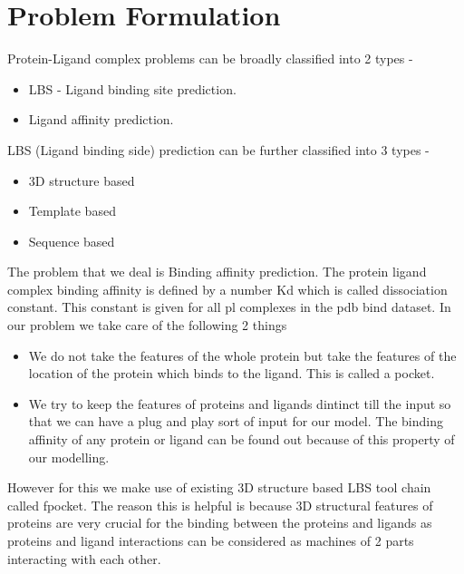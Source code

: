 \documentclass[11pt]{article}
\begin{document}
\section{Problem Formulation}
Protein-Ligand complex problems can be broadly classified into 2 types -
\begin{itemize}
\item LBS - Ligand binding site prediction.
\item Ligand affinity prediction.
\end{itemize} 

LBS (Ligand binding side) prediction can be further classified into 3 types -
\begin{itemize}
\item 3D structure based
\item Template based
\item Sequence based
\end{itemize}

The problem that we deal is Binding affinity prediction. 
The protein ligand complex binding affinity is defined by a number Kd which is called dissociation constant.
This constant is given for all pl complexes in the pdb bind dataset.
In our problem we take care of the following 2 things
\begin{itemize}
\item We do not take the features of the whole protein
but take the features of the location of the protein which binds to the ligand.
This is called a pocket.
\item We try to keep the features of proteins and ligands dintinct till the input so that we can have a plug and play sort of input for our model.
The binding affinity of any protein or ligand can be found out because of this property of our modelling.
\end{itemize}

However for this we make use of existing 3D structure based LBS tool chain called fpocket.
The reason this is helpful is because 3D structural features of proteins are very crucial for the binding between 
the proteins and ligands as proteins and ligand interactions can be considered as
machines of 2 parts interacting with each other.
\end{document}
